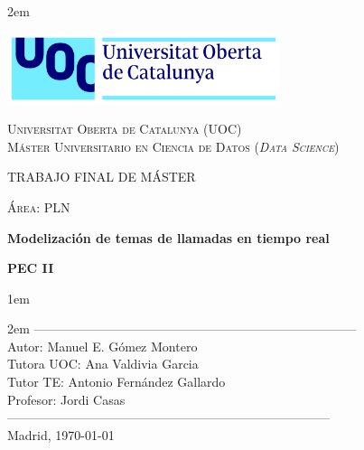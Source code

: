 \newpage
\thispagestyle{empty}

\baselineskip 2em


\centerline{\includegraphics[width=0.6\textwidth]{images/UOC-logo}}
\begin{center}
\textsc{Universitat Oberta de Catalunya (UOC) \\
 Máster Universitario en Ciencia de Datos (\textit{Data Science})\\}


\vspace*{1.5cm}

\textsc{\Large TRABAJO FINAL DE MÁSTER}

\vspace*{0.5cm}

\textsc{\large Área: PLN}



\vspace*{2.0cm}

\textbf{\Large Modelización de temas de llamadas en tiempo real}

\textbf{\large PEC II}

\vspace{2.5cm}
\baselineskip 1em

\baselineskip 2em
-----------------------------------------------------------------------------\\
Autor:      Manuel E. Gómez Montero\\
Tutora UOC:      Ana Valdivia Garcia\\
Tutor TE:      Antonio Fernández Gallardo\\
Profesor:   Jordi Casas\\
-----------------------------------------------------------------------------\\
\vspace*{1.5cm}
Madrid, \today

\end{center}

\newpage
\pagestyle{empty}
\hfill
